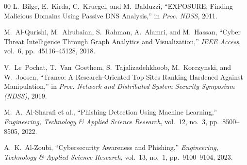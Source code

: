 \documentclass[10pt,twocolumn,letterpaper]{article}
\begin{document}
\begin{thebibliography}{00}
L.~Bilge, E.~Kirda, C.~Kruegel, and M.~Balduzzi, ``EXPOSURE: Finding Malicious Domains Using Passive DNS Analysis,'' in \textit{Proc. NDSS}, 2011.

M.~Al-Qurishi, M.~Alrubaian, S.~Rahman, A.~Alamri, and M.~Hassan, ``Cyber Threat Intelligence Through Graph Analytics and Visualization,'' \textit{IEEE Access}, vol.~6, pp.~45116--45128, 2018.

V.~Le~Pochat, T.~Van~Goethem, S.~Tajalizadehkhoob, M.~Korczynski, and W.~Joosen, ``Tranco: A Research-Oriented Top Sites Ranking Hardened Against Manipulation,'' in \textit{Proc. Network and Distributed System Security Symposium (NDSS)}, 2019.

M.~A.~Al-Sharafi et al., ``Phishing Detection Using Machine Learning,'' \textit{Engineering, Technology \& Applied Science Research}, vol.~12, no.~3, pp.~8500--8505, 2022.

A.~K.~Al-Zoubi, ``Cybersecurity Awareness and Phishing,'' \textit{Engineering, Technology \& Applied Science Research}, vol.~13, no.~1, pp.~9100--9104, 2023.

\end{thebibliography}
\end{document}
